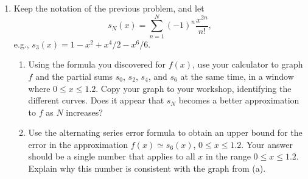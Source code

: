 \documentclass[12pt]{article}
\begin{document}
\begin{enumerate}
\begin{enumerate}
\begin{enumerate}
\item Verify (1) using the original summation (sigma) notation. This 
is a bit tricky (which is why it is 
a good idea to do i first); you will have to make a change 
of summation index. 

\end{enumerate}

\item Explain why $y = f(x)$ is a solution of the initial value problem 
$$y' = 2xy,\;\;\;\;\;\;y(0) = 1.$$

\item Solve this initial value problem and thereby obtain a formula 
for f(x) in terms of 
"elementary functions" (those found on your calculator). 

\end{enumerate}

\item Keep the notation of the previous problem, and let 
$$s_{N}(x) =\sum_{n=1}^{N}(-1)^{n}\frac{x^{2n}}{n!},$$ 
e.g., $s_{3}(x) = 1- x^{2} + x^{4}/2- x^{6}/6$. 

\begin{enumerate}

\item Using the formula you discovered for $f(x)$, use your calculator 
to graph $f$ and the 
partial sums $s_{0}$, $s_{2}$, $s_{4}$, and $s_{6}$ at the same time, 
in a window where $0 \le x \le 1.2$. Copy 
your graph to your workshop, identifying the different curves. 
Does it appear that $s_{N}$ 
becomes a better approximation to $f$ as $N$ increases? 

\item Use the alternating series error formula to obtain an 
upper bound for the error in the 
approximation $f(x) \simeq s_{6}(x)$, $0 \le x \le 1.2$. 
Your answer should be a single number that 
applies to all $x$ in the range $0 \le x \le 1.2$. Explain why 
this number is consistent with the 
graph from (a). 

\end{enumerate}

\end{enumerate}
\end{document}
